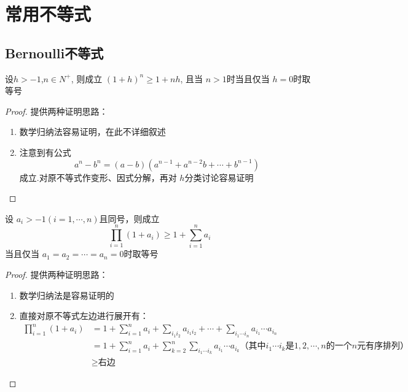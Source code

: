 \chapter{常用不等式}
\section{Bernoulli不等式}
\begin{proposition}[Bernoulli不等式]
    设$h>-1$,$ n \in N^+ $, 则成立 $ (1+h)^n \geq 1 + nh $, 且当 $ n > 1 $时当且仅当 $ h = 0 $时取等号
\end{proposition}
\begin{proof}
    提供两种证明思路：
    \begin{enumerate}
        \item 数学归纳法容易证明，在此不详细叙述
        \item 注意到有公式
        \begin{equation*}
            a^n - b^n = (a-b)(a^{n-1} + a^{n-2}b + \cdots + b^{n-1})
        \end{equation*}
        成立.对原不等式作变形、因式分解，再对 $ h $分类讨论容易证明
    \end{enumerate}
\end{proof}

\begin{proposition}[推广]
    设 $ a_i > -1(i = 1, \cdots, n) $且同号，则成立
    \begin{equation*}
        \prod_{i=1}^{n}(1+a_i) \geq 1 + \sum_{i=1}^{n}a_i
    \end{equation*}
    当且仅当 $ a_1 = a_2 = \cdots = a_n = 0 $时取等号
\end{proposition}
\begin{proof}
    提供两种证明思路：
    \begin{enumerate}
        \item 数学归纳法是容易证明的
        \item 直接对原不等式左边进行展开有：
        \begin{equation*}
            \begin{split}
                \prod_{i=1}^{n}(1+a_i) 
                &= 1 + \sum_{i=1}^{n}a_i + \sum_{i_1 i_2}^{}a_{i_1 i_2} + \cdots + \sum_{i_1 \cdots i_n}^{}a_{i_1} \cdots a_{i_n}   \\
                &= 1 + \sum_{i=1}^{n}a_i + \sum_{k=2}^{n}\sum_{i_1 \cdots i_k}^{}a_{i_1} \cdots a_{i_k}\text{（其中$i_1 \cdots i_k$是$1,2,\cdots,n$的一个$n$元有序排列）}\\
                &\geq \text{右边}
            \end{split}
        \end{equation*}
    \end{enumerate}
\end{proof}

